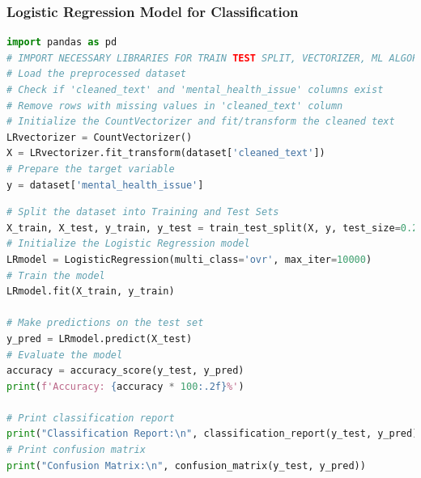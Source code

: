\subsubsection{Logistic Regression Model for Classification}
\begin{tcolorbox}[colback=gray!5!white, colframe=gray!80!black, boxrule=0.5pt, title=Logistic Regression for Mental Health Classification]
    \begin{lstlisting}[language=Python]
import pandas as pd
# IMPORT NECESSARY LIBRARIES FOR TRAIN TEST SPLIT, VECTORIZER, ML ALGORITHM
# Load the preprocessed dataset
# Check if 'cleaned_text' and 'mental_health_issue' columns exist
# Remove rows with missing values in 'cleaned_text' column
# Initialize the CountVectorizer and fit/transform the cleaned text
LRvectorizer = CountVectorizer()
X = LRvectorizer.fit_transform(dataset['cleaned_text'])
# Prepare the target variable
y = dataset['mental_health_issue']
\end{lstlisting}
\end{tcolorbox}

\begin{tcolorbox}[colback=gray!5!white, colframe=gray!80!black, boxrule=0.5pt, title=Logistic Regression for Mental Health Classification]
    \begin{lstlisting}[language=Python]
# Split the dataset into Training and Test Sets
X_train, X_test, y_train, y_test = train_test_split(X, y, test_size=0.2, random_state=42)
# Initialize the Logistic Regression model
LRmodel = LogisticRegression(multi_class='ovr', max_iter=10000)
# Train the model
LRmodel.fit(X_train, y_train)

# Make predictions on the test set
y_pred = LRmodel.predict(X_test)
# Evaluate the model
accuracy = accuracy_score(y_test, y_pred)
print(f'Accuracy: {accuracy * 100:.2f}%')

# Print classification report
print("Classification Report:\n", classification_report(y_test, y_pred))
# Print confusion matrix
print("Confusion Matrix:\n", confusion_matrix(y_test, y_pred))
\end{lstlisting}
\end{tcolorbox}

